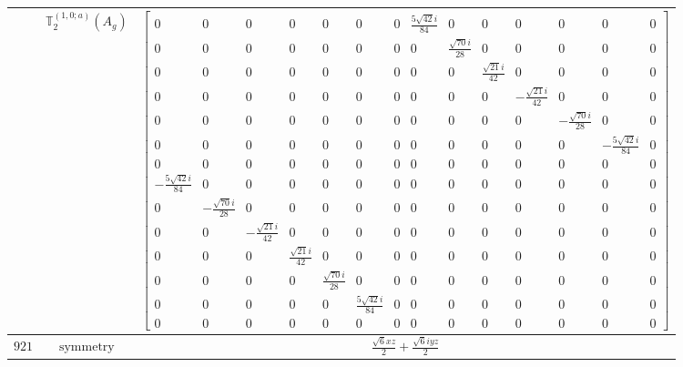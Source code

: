 \documentclass[fleqn,8pt,landscape]{jsarticle}
\begin{document}
\begin{longtable}{ccc}
$  $ & $ \mathbb{T}_{2}^{(1,0;a)}(A_{g}) $ & $ \begin{bmatrix} 0 & 0 & 0 & 0 & 0 & 0 & 0 & \frac{5 \sqrt{42} i}{84} & 0 & 0 & 0 & 0 & 0 & 0 \\ 0 & 0 & 0 & 0 & 0 & 0 & 0 & 0 & \frac{\sqrt{70} i}{28} & 0 & 0 & 0 & 0 & 0 \\ 0 & 0 & 0 & 0 & 0 & 0 & 0 & 0 & 0 & \frac{\sqrt{21} i}{42} & 0 & 0 & 0 & 0 \\ 0 & 0 & 0 & 0 & 0 & 0 & 0 & 0 & 0 & 0 & - \frac{\sqrt{21} i}{42} & 0 & 0 & 0 \\ 0 & 0 & 0 & 0 & 0 & 0 & 0 & 0 & 0 & 0 & 0 & - \frac{\sqrt{70} i}{28} & 0 & 0 \\ 0 & 0 & 0 & 0 & 0 & 0 & 0 & 0 & 0 & 0 & 0 & 0 & - \frac{5 \sqrt{42} i}{84} & 0 \\ 0 & 0 & 0 & 0 & 0 & 0 & 0 & 0 & 0 & 0 & 0 & 0 & 0 & 0 \\ - \frac{5 \sqrt{42} i}{84} & 0 & 0 & 0 & 0 & 0 & 0 & 0 & 0 & 0 & 0 & 0 & 0 & 0 \\ 0 & - \frac{\sqrt{70} i}{28} & 0 & 0 & 0 & 0 & 0 & 0 & 0 & 0 & 0 & 0 & 0 & 0 \\ 0 & 0 & - \frac{\sqrt{21} i}{42} & 0 & 0 & 0 & 0 & 0 & 0 & 0 & 0 & 0 & 0 & 0 \\ 0 & 0 & 0 & \frac{\sqrt{21} i}{42} & 0 & 0 & 0 & 0 & 0 & 0 & 0 & 0 & 0 & 0 \\ 0 & 0 & 0 & 0 & \frac{\sqrt{70} i}{28} & 0 & 0 & 0 & 0 & 0 & 0 & 0 & 0 & 0 \\ 0 & 0 & 0 & 0 & 0 & \frac{5 \sqrt{42} i}{84} & 0 & 0 & 0 & 0 & 0 & 0 & 0 & 0 \\ 0 & 0 & 0 & 0 & 0 & 0 & 0 & 0 & 0 & 0 & 0 & 0 & 0 & 0 \end{bmatrix} $ \\ \hline
$ 921 $ & $ \text{symmetry} $ & $ \frac{\sqrt{6} x z}{2} + \frac{\sqrt{6} i y z}{2} $ \\

\end{longtable}
\end{document}
